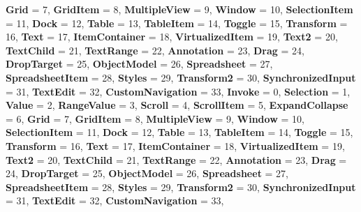 \begin{DoxyCompactItemize}
{\bfseries Grid} = 7, 
\newline
{\bfseries Grid\+Item} = 8, 
{\bfseries Multiple\+View} = 9, 
{\bfseries Window} = 10, 
{\bfseries Selection\+Item} = 11, 
\newline
{\bfseries Dock} = 12, 
{\bfseries Table} = 13, 
{\bfseries Table\+Item} = 14, 
{\bfseries Toggle} = 15, 
\newline
{\bfseries Transform} = 16, 
{\bfseries Text} = 17, 
{\bfseries Item\+Container} = 18, 
{\bfseries Virtualized\+Item} = 19, 
\newline
{\bfseries Text2} = 20, 
{\bfseries Text\+Child} = 21, 
{\bfseries Text\+Range} = 22, 
{\bfseries Annotation} = 23, 
\newline
{\bfseries Drag} = 24, 
{\bfseries Drop\+Target} = 25, 
{\bfseries Object\+Model} = 26, 
{\bfseries Spreadsheet} = 27, 
\newline
{\bfseries Spreadsheet\+Item} = 28, 
{\bfseries Styles} = 29, 
{\bfseries Transform2} = 30, 
{\bfseries Synchronized\+Input} = 31, 
\newline
{\bfseries Text\+Edit} = 32, 
{\bfseries Custom\+Navigation} = 33, 
{\bfseries Invoke} = 0, 
{\bfseries Selection} = 1, 
\newline
{\bfseries Value} = 2, 
{\bfseries Range\+Value} = 3, 
{\bfseries Scroll} = 4, 
{\bfseries Scroll\+Item} = 5, 
\newline
{\bfseries Expand\+Collapse} = 6, 
{\bfseries Grid} = 7, 
{\bfseries Grid\+Item} = 8, 
{\bfseries Multiple\+View} = 9, 
\newline
{\bfseries Window} = 10, 
{\bfseries Selection\+Item} = 11, 
{\bfseries Dock} = 12, 
{\bfseries Table} = 13, 
\newline
{\bfseries Table\+Item} = 14, 
{\bfseries Toggle} = 15, 
{\bfseries Transform} = 16, 
{\bfseries Text} = 17, 
\newline
{\bfseries Item\+Container} = 18, 
{\bfseries Virtualized\+Item} = 19, 
{\bfseries Text2} = 20, 
{\bfseries Text\+Child} = 21, 
\newline
{\bfseries Text\+Range} = 22, 
{\bfseries Annotation} = 23, 
{\bfseries Drag} = 24, 
{\bfseries Drop\+Target} = 25, 
\newline
{\bfseries Object\+Model} = 26, 
{\bfseries Spreadsheet} = 27, 
{\bfseries Spreadsheet\+Item} = 28, 
{\bfseries Styles} = 29, 
\newline
{\bfseries Transform2} = 30, 
{\bfseries Synchronized\+Input} = 31, 
{\bfseries Text\+Edit} = 32, 
{\bfseries Custom\+Navigation} = 33, 
\newline

\end{DoxyCompactItemize}
